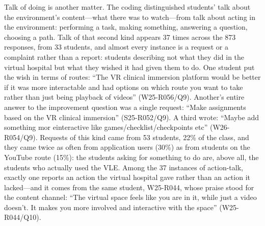 Talk of doing is another matter. The coding distinguished students' talk
about the environment's content---what there was to watch---from talk about
acting in the environment: performing a task, making something, answering a
question, choosing a path. Talk of that second kind appears 37 times across
the 873 responses, from 33 students, and almost every instance is a request
or a complaint rather than a report: students describing not what they did
in the virtual hospital but what they wished it had given them to do. One
student put the wish in terms of routes: ``The VR clinical immersion
platform would be better if it was more interactable and had options on
which route you want to take rather than just being playback of videos''
(W25-R056/Q9). Another's entire answer to the improvement question was a
single request: ``Make assignments based on the VR clinical immersion''
(S25-R052/Q9). A third wrote: ``Maybe add something mor einteractive like
games/checklist/checkpoints etc'' (W26-R054/Q9). Requests of this kind came
from 53 students, 22\% of the class, and they came twice as often from
application users (30\%) as from students on the YouTube route (15\%): the
students asking for something to do are, above all, the students who
actually used the VLE. Among the 37 instances of action-talk, exactly one
reports an action the virtual hospital gave rather than an action it
lacked---and it comes from the same student, W25-R044, whose praise stood
for the content channel: ``The virtual space feels like you are in it,
while just a video doesn't. It makes you more involved and interactive with
the space'' (W25-R044/Q10).

